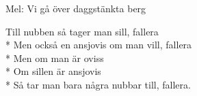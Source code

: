 \begin{SongText}
    \begin{SongInfo}
        Mel: Vi gå över daggstänkta berg
    \end{SongInfo}
    \begin{SongVerse}
        Till nubben så tager man sill, fallera\\*%
        Men också en ansjovis om man vill, fallera\\*%
        Men om man är oviss\\*%
        Om sillen är ansjovis\\*%
        Så tar man bara några nubbar till, fallera.
    \end{SongVerse}
\end{SongText}
